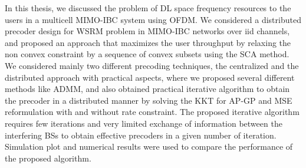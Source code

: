 


In this thesis, we discussed the problem of \ac{DL} space frequency resources to the users in a multicell \ac{MIMO}-\ac{IBC} system using \ac{OFDM}. We considered a distributed precoder design for \ac{WSRM} problem in \ac{MIMO}-\ac{IBC} networks over \ac{iid} channels, and proposed an approach that maximizes the user throughput  by relaxing the non convex constraint by a sequence of convex subsets using the \ac{SCA} method.  We considered mainly two different precoding techniques, the centralized and the distributed approach with practical  aspects, where we proposed several different methods like \ac{ADMM}, and also obtained practical iterative algorithm to obtain the precoder in a distributed manner by solving the \ac{KKT} for \ac{AP-GP} and \ac{MSE} reformulation with and without rate constraint. The proposed iterative algorithm requires few iterations and very limited exchange of information between the interfering \ac{BS}s to obtain effective precoders in a given number of iteration. Simulation plot and numerical results were used to compare the performance of the proposed algorithm.
